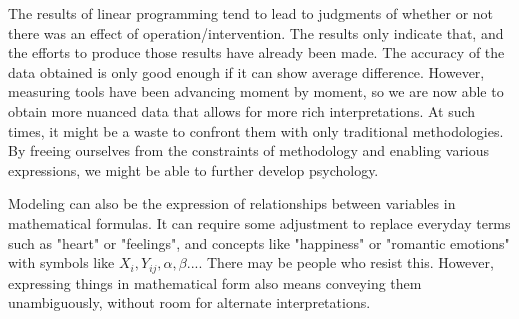 \documentclass{ltjsbook}
\begin{document}
The results of linear programming tend to lead to judgments of whether or not there was an effect of operation/intervention. The results only indicate that, and the efforts to produce those results have already been made. The accuracy of the data obtained is only good enough if it can show average difference. However, measuring tools have been advancing moment by moment, so we are now able to obtain more nuanced data that allows for more rich interpretations. At such times, it might be a waste to confront them with only traditional methodologies.
By freeing ourselves from the constraints of methodology and enabling various expressions, we might be able to further develop psychology.

Modeling can also be the expression of relationships between variables in mathematical formulas. It can require some adjustment to replace everyday terms such as "heart" or "feelings", and concepts like "happiness" or "romantic emotions" with symbols like $X_i,Y_{ij},\alpha,\beta...$. There may be people who resist this. However, expressing things in mathematical form also means conveying them unambiguously, without room for alternate interpretations.
\end{document}
